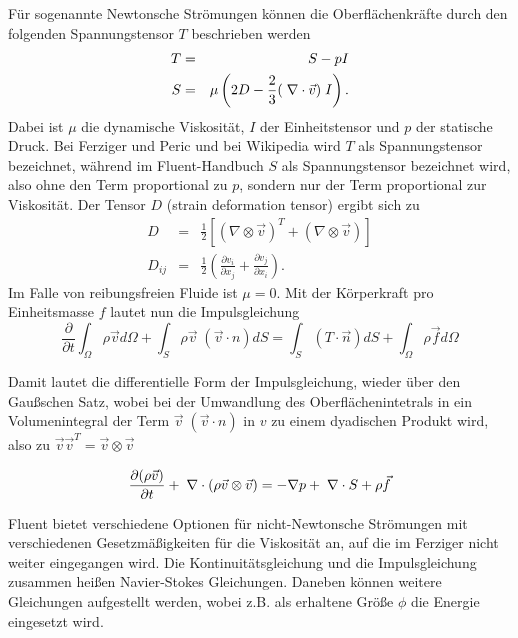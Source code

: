 Für sogenannte Newtonsche Strömungen können die Oberflächenkräfte durch den
folgenden Spannungstensor $T$ beschrieben
werden
\begin{eqnarray*}
T &=& S - p I \\
S &=& \mu \left( 2 D - \frac{2}{3} (\;\nabla \cdot \vec{v})\; I \right) .
\end{eqnarray*}
Dabei ist $\mu$ die dynamische Viskosität, $I$ der Einheitstensor und
$p$ der statische Druck.  Bei Ferziger und Peric und bei Wikipedia
wird $T$ als Spannungstensor bezeichnet, während im Fluent-Handbuch
$S$ als Spannungstensor bezeichnet wird, also ohne den Term
proportional zu $p$, sondern nur der Term proportional zur
Viskosität. Der Tensor $D$ (strain deformation tensor) ergibt sich zu
\begin{eqnarray*}
D &=&\frac{1}{2}\left[ (\nabla \otimes \vec{v})^T + (\nabla \otimes \vec{v})\right]\\
D_{ij} &=& \frac{1}{2}\left(\frac{\partial v_i}{\partial x_j} 
                         +\frac{\partial v_j}{\partial x_i} \right).
\end{eqnarray*}
Im Falle von reibungsfreien Fluide ist $\mu=0$. Mit der Körperkraft
pro Einheitsmasse $f$ lautet nun die Impulsgleichung
\begin{equation}
\frac{\partial}{\partial t} \int_{\Omega} \rho \vec{v} d \Omega 
+
\int_{S} \rho \vec{v} \; (\vec{v}\cdot n) d S 
= 
\int_{S} (T \cdot \vec{n}) d S 
+
\int_{\Omega} \rho \vec{f} d \Omega
\end{equation} 

Damit lautet die differentielle Form der Impulsgleichung, wieder über
den Gaußschen Satz, wobei bei der Umwandlung des Oberflächenintetrals
in ein Volumenintegral der Term $\vec{v} \; (\vec{v}\cdot n)$ in $v$
zu einem dyadischen Produkt wird, also zu $\vec{v}\vec{v}^T =
\vec{v}\otimes\vec{v}$

\begin{equation}
\frac{\partial (\rho \vec{v})}{\partial t} + \;\nabla \cdot (\rho \vec{v}\otimes
\vec{v}) = - \nabla p + \;\nabla \cdot S + \rho \vec{f}\label{eq:impuls_diff}
\end{equation}

Fluent bietet verschiedene Optionen für nicht-Newton\-sche Strömungen mit
verschiedenen Gesetzmäßigkeiten für die Viskosität an, auf die im Ferziger
nicht weiter eingegangen wird.  Die Kontinuitätsgleichung und die
Impulsgleichung zusammen heißen Navier-Stokes Gleichungen.  Daneben können
weitere Gleichungen aufgestellt werden, wobei z.B. als erhaltene Größe $\phi$
die Energie eingesetzt wird.


